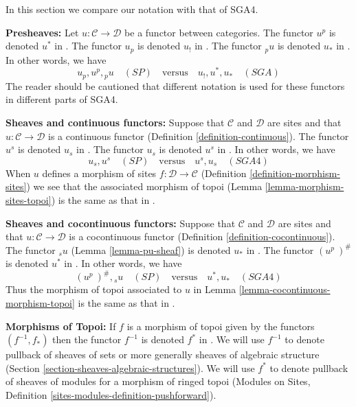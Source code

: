 \noindent
In this section we compare our notation with that of SGA4.

\medskip\noindent
{\bf Presheaves:} Let $u : \mathcal{C} \to \mathcal{D}$ be a functor
between categories.
The functor $u^p$ is denoted $u^*$ in \cite[Exposee I, Section 5]{SGA4}.
The functor $u_p$ is denoted $u_!$ in \cite[Exposee I, Proposition 5.1]{SGA4}.
The functor ${}_pu$ is denoted $u_*$ in
\cite[Exposee I, Proposition 5.1]{SGA4}.
In other words, we have
$$
u_p, u^p, {}_pu\quad(SP)
\quad\text{versus}\quad
u_!, u^*, u_*\quad(SGA)
$$
The reader should be cautioned that different notation is used for these
functors in different parts of SGA4.

\medskip\noindent
{\bf Sheaves and continuous functors:}
Suppose that $\mathcal{C}$ and $\mathcal{D}$ are sites and that
$u : \mathcal{C} \to \mathcal{D}$ is
a continuous functor (Definition \ref{definition-continuous}).
The functor $u^s$ is denoted $u_s$ in \cite[Exposee III, 1.11]{SGA4}.
The functor $u_s$ is denoted $u^s$ in
\cite[Exposee III, Proposition 1.2]{SGA4}.
In other words, we have
$$
u_s, u^s\quad(SP)
\quad\text{versus}\quad
u^s, u_s\quad(SGA4)
$$
When $u$ defines a morphism of sites
$f : \mathcal{D} \to \mathcal{C}$
(Definition \ref{definition-morphism-sites})
we see that the associated morphism of topoi
(Lemma \ref{lemma-morphism-sites-topoi}) is the same as that in
\cite[Exposee IV, (4.9.1.1)]{SGA4}.

\medskip\noindent
{\bf Sheaves and cocontinuous functors:}
Suppose that $\mathcal{C}$ and $\mathcal{D}$ are sites and that
$u : \mathcal{C} \to \mathcal{D}$ is
a cocontinuous functor (Definition \ref{definition-cocontinuous}).
The functor ${}_su$ (Lemma \ref{lemma-pu-sheaf}) is denoted $u_*$ in
\cite[Exposee III, Proposition 2.3]{SGA4}.
The functor $(u^p\ )^\#$ is denoted $u^*$ in
\cite[Exposee III, Proposition 2.3]{SGA4}.
In other words, we have
$$
(u^p\ )^\#, {}_su\quad(SP)
\quad\text{versus}\quad
u^*, u_*\quad(SGA4)
$$
Thus the morphism of topoi associated to $u$ in
Lemma \ref{lemma-cocontinuous-morphism-topoi}
is the same as that in \cite[Exposee IV, 4.7]{SGA4}.

\medskip\noindent
{\bf Morphisms of Topoi:} If $f$ is a morphism of topoi given
by the functors $(f^{-1}, f_*)$ then the functor $f^{-1}$
is denoted $f^*$ in \cite[Exposee IV, Definition 3.1]{SGA4}.
We will use $f^{-1}$ to denote pullback of sheaves of sets
or more generally sheaves of algebraic structure
(Section \ref{section-sheaves-algebraic-structures}).
We will use $f^*$ to denote pullback of sheaves of modules
for a morphism of ringed topoi
(Modules on Sites, Definition \ref{sites-modules-definition-pushforward}).



